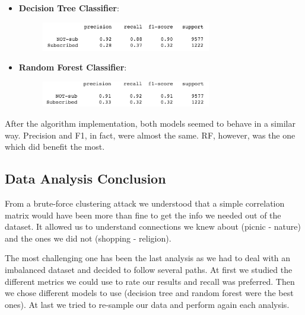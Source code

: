\begin{itemize}
\item \textbf{Decision Tree Classifier}: 

\begin{figure}[H]
\centering
\includegraphics[width=0.7\textwidth]{Img/smote_tree.png}
\end{figure}
\item \textbf{Random Forest Classifier}: 

\begin{figure}[H]
\centering
\includegraphics[width=0.7\textwidth]{Img/smote_forest.png}
\end{figure}
\end{itemize}

After the algorithm implementation, both models seemed to behave in a similar way. Precision and F1, in fact, were almost the same. RF, however, was the one which did benefit the most.

\subsection{Data Analysis Conclusion}
From a brute-force clustering attack we understood that a simple correlation matrix would have been more than fine to get the info we needed out of the dataset. It allowed us to understand connections we knew about (picnic - nature) and the ones we did not (shopping - religion).

The most challenging one has been the last analysis as we had to deal with an imbalanced dataset and decided to follow several paths. At first we studied the different metrics we could use to rate our results and recall was preferred. Then we chose different models to use (decision tree and random forest were the best ones). At last we tried to re-sample our data and perform again each analysis.

